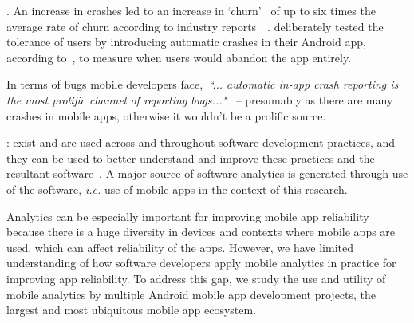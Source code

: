 . An increase in crashes led to an increase in `churn'~ of up to six times the average rate of churn according to industry reports~~. 
 deliberately tested the tolerance of users by introducing automatic crashes in their Android app, according to~, to measure when users would abandon the app entirely. %

In terms of bugs mobile developers face,~\emph{``... automatic in-app crash reporting is the most prolific channel of reporting bugs..."}~ %
-- presumably as there are many crashes in mobile apps, otherwise it wouldn't be a prolific source. 

\medskip

: exist and are used across and throughout software development practices, and they can be used to better understand and improve these practices and the resultant software~. A major source of software analytics is generated through use of the software, \emph{i.e.} use of mobile apps in the context of this research.

Analytics can be especially important for improving mobile app reliability because there is a huge diversity in devices and contexts where mobile apps are used, which can affect reliability of the apps. However, we have limited understanding of how software developers apply mobile analytics in practice for improving app reliability. To address this gap, we study the use and utility of mobile analytics by multiple Android mobile app development projects, the largest and most ubiquitous mobile app ecosystem.

